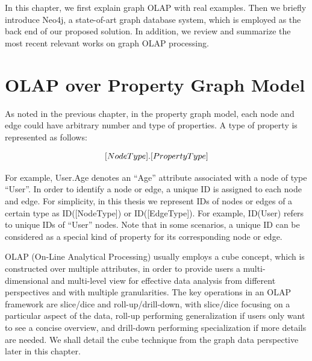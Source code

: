 In this chapter, we first explain graph OLAP with real examples. Then we briefly introduce Neo4j, a state-of-art graph database system, which is employed as the back end of our proposed solution. In addition, we review and summarize the most recent relevant works on graph OLAP processing.


\section{OLAP over Property Graph Model}


As noted in the previous chapter, in the property graph model, each node and edge could have arbitrary number and type of properties. A type of property is represented as follows:

\begin{displaymath}
\centering
[NodeType].[PropertyType]
\end{displaymath}

For example, User.Age denotes an ``Age'' attribute associated with a node of type ``User''. In order to identify a node or edge, a unique ID is assigned to each node and edge. For simplicity, in this thesis we represent IDs of nodes or edges of a certain type as ID([NodeType]) or ID([EdgeType]). For example, ID(User) refers to unique IDs of ``User'' nodes. Note that in some scenarios, a unique ID can be considered as a special kind of property for its corresponding node or edge.


OLAP (On-Line Analytical Processing) \cite{DBLP:conf/sigmod/BeyerR99, DBLP:journals/datamine/GrayCBLRVPP97, DBLP:conf/sigmod/ZhaoDN97} usually employs a cube concept, which is constructed over multiple attributes, in order to provide users a multi-dimensional and multi-level view for effective data analysis from different perspectives and with multiple granularities. The key operations in an OLAP framework are slice/dice and roll-up/drill-down, with slice/dice focusing on a particular aspect of the data, roll-up performing generalization if users only want to see a concise overview, and drill-down performing specialization if more details are needed. We shall detail the cube technique from the graph data perspective later in this chapter.



